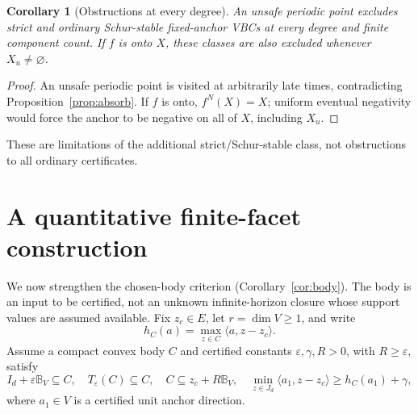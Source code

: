 \documentclass[10pt,letterpaper]{article}
\newtheorem{corollary}{Corollary}
\theoremstyle{remark}
\newcommand{\ball}{\mathbb B_V}
\begin{document}
\begin{corollary}[Obstructions at every degree]\label{cor:onto}
An unsafe periodic point excludes strict and ordinary Schur-stable fixed-anchor VBCs at every degree and finite component count. If $f$ is onto $X$, these classes are also excluded whenever $X_u\neq\varnothing$.
\end{corollary}
\begin{proof}
An unsafe periodic point is visited at arbitrarily late times, contradicting Proposition~\ref{prop:absorb}. If $f$ is onto, $f^N(X)=X$; uniform eventual negativity would force the anchor to be negative on all of $X$, including $X_u$.
\end{proof}
These are limitations of the additional strict/Schur-stable class, not obstructions to all ordinary certificates.

\section{A quantitative finite-facet construction}\label{sec:quant}
We now strengthen the chosen-body criterion (Corollary~\ref{cor:body}). The body is an input to be certified, not an unknown infinite-horizon closure whose support values are assumed available. Fix $z_c\in E$, let $r=\dim V\geq1$, and write
\[
 h_C(a)=\max_{z\in C}\langle a,z-z_c\rangle.
\]
Assume a compact convex body $C$ and certified constants $\varepsilon,\gamma,R>0$, with $R\geq\varepsilon$, satisfy
\begin{equation}\label{eq:bodydata}
 I_d+\varepsilon\ball\subseteq C,\quad T_\varepsilon(C)\subseteq C,\quad
 C\subseteq z_c+R\ball,\quad
 \min_{z\in J_d}\langle a_1,z-z_c\rangle\geq h_C(a_1)+\gamma,
\end{equation}
where $a_1\in V$ is a certified unit anchor direction.
\end{document}
